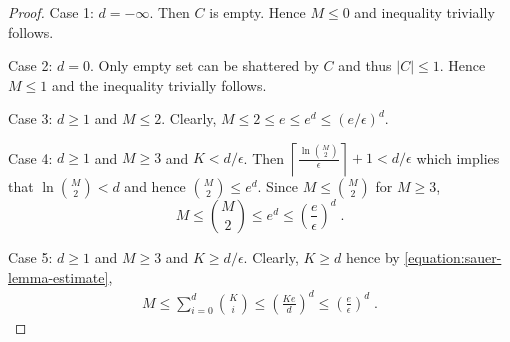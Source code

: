\documentclass[10pt]{article}
\begin{document}
\begin{proof}
Case 1: $d = -\infty$. Then $C$ is empty. Hence $M \le 0$ and inequality trivially follows.

Case 2: $d = 0$. Only empty set can be shattered by $C$ and thus $|C| \le 1$. Hence $M \le 1$ and the inequality trivially follows.

Case 3: $d \ge 1$ and $M \le 2$. Clearly, $M \le 2 \le e \le e^d \le (e/\epsilon)^d$.

Case 4: $d \ge 1$ and $M \ge 3$ and $K < d/\epsilon$. Then
$\left\lceil \frac{\ln \binom{M}{2}}{\epsilon} \right\rceil + 1 < d/\epsilon$
which implies that $\ln \binom{M}{2} < d$ and hence $\binom{M}{2} \le e^d$.
Since $M \le \binom{M}{2}$ for $M \ge 3$,
$$
M \le \binom{M}{2} \le e^d \le \left( \frac{e}{\epsilon} \right)^d \; .
$$

Case 5: $d \ge 1$ and $M \ge 3$ and $K \ge d/\epsilon$. Clearly, $K \ge d$ hence by \eqref{equation:sauer-lemma-estimate},
\begin{align*}
M
\le \sum_{i=0}^d \binom{K}{i}
\le \left( \frac{Ke}{d} \right)^d
\le \left( \frac{e}{\epsilon} \right)^d \; .
\end{align*}
\end{proof}
\end{document}
